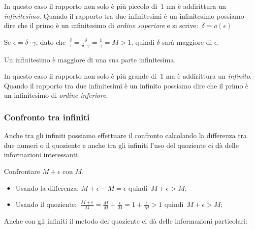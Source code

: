 \begin{osservazione}
In questo caso il rapporto non solo è più piccolo di~1 ma è addirittura un 
\emph{infinitesimo}. 
Quando il rapporto tra due infinitesimi è un infinitesimo 
possiamo dire che il primo è un infinitesimo di \emph{ordine superiore} e si 
scrive:~$\delta=o(\epsilon)$
\end{osservazione}

\begin{esempio}
Se $\epsilon = \delta \cdot \gamma$, dato 
che~$\frac{\delta}{\epsilon}=\frac{\delta}{\delta \cdot \gamma}=
\frac{1}{\gamma}=M>1$, quindi
$\delta$ sarà maggiore di $\epsilon$.

Un infinitesimo è maggiore di una sua parte infinitesima.
\end{esempio}

\begin{osservazione}
In questo caso il rapporto non solo è più grande di~1 ma è addirittura un 
\emph{infinito}. 
Quando il rapporto tra due infinitesimi è un infinito 
possiamo dire che il primo è un infinitesimo di \emph{ordine inferiore}.
\end{osservazione}

\subsubsection{Confronto tra infiniti}
\label{subsubsec:insnum_confrontoreali}

Anche tra gli infiniti possiamo effettuare il confronto calcolando la 
differenza tra due numeri o il quoziente e anche tra gli infiniti l'uso del 
quoziente ci dà delle informazioni interessanti.

\begin{esempio}
Confrontare $M+\epsilon$ con $M$.
\begin{itemize} [noitemsep]
 \item Usando la differenza: $M+\epsilon - M = \epsilon$ 
quindi~$M+\epsilon > M$;
 \item Usando il quoziente:~$\frac{M+\epsilon}{M}= 
\frac{M}{M}+\frac{\epsilon}{M}= 1 + \frac{\epsilon}{M} > 1$
quindi~$M+\epsilon > M$;
\end{itemize}
\end{esempio}

\noindent Anche con gli infiniti il metodo del quoziente ci dà delle 
informazioni 
particolari:

